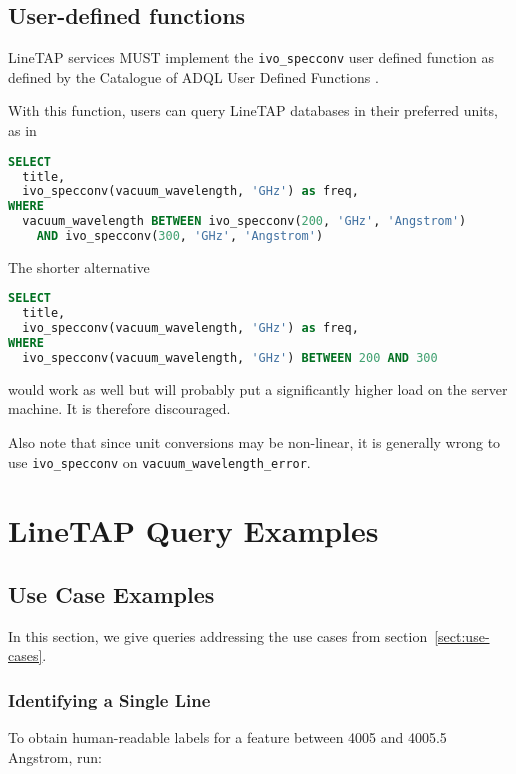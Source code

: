 \documentclass[11pt,a4paper]{ivoa}
\begin{document}
\subsection{User-defined functions}

LineTAP services MUST implement the \texttt{ivo\_specconv} user defined
function as defined by the Catalogue of ADQL User Defined Functions
\citep{2021ivoa.spec.0310C}.

With this function, users can query LineTAP databases in their preferred
units, as in

\begin{lstlisting}[language=SQL]
SELECT 
  title,
  ivo_specconv(vacuum_wavelength, 'GHz') as freq,
WHERE
  vacuum_wavelength BETWEEN ivo_specconv(200, 'GHz', 'Angstrom') 
    AND ivo_specconv(300, 'GHz', 'Angstrom')
\end{lstlisting}

The shorter alternative

\begin{lstlisting}[language=SQL]
SELECT 
  title,
  ivo_specconv(vacuum_wavelength, 'GHz') as freq,
WHERE
  ivo_specconv(vacuum_wavelength, 'GHz') BETWEEN 200 AND 300
\end{lstlisting}

would work as well but will probably put a significantly higher load on
the server machine.  It is therefore discouraged.

Also note that since unit conversions may be non-linear, it is generally
wrong to use \texttt{ivo\_specconv} on
\texttt{vacuum\_wavelength\_error}.


\section{LineTAP Query Examples}

\subsection{Use Case Examples}

In this section, we give queries addressing the use cases from
section~\ref{sect:use-cases}.

\subsubsection{Identifying a Single Line}

To obtain human-readable labels for a feature between 4005 and 4005.5
Angstrom, run:
\end{document}
